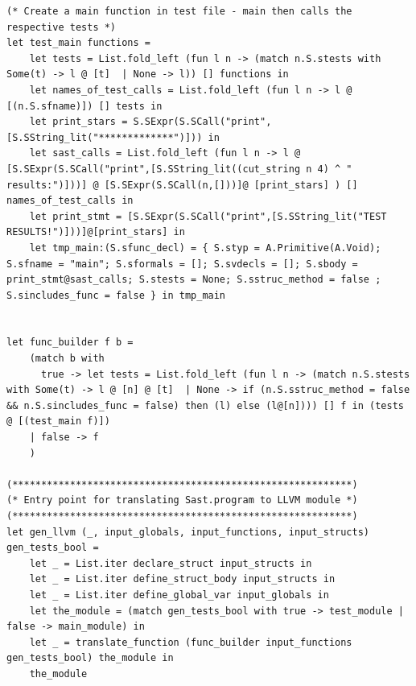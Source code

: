 \documentclass{article}
\begin{document}
\begin{lstlisting}
(* Create a main function in test file - main then calls the respective tests *)
let test_main functions = 
	let tests = List.fold_left (fun l n -> (match n.S.stests with Some(t) -> l @ [t]  | None -> l)) [] functions in 
	let names_of_test_calls = List.fold_left (fun l n -> l @ [(n.S.sfname)]) [] tests in
	let print_stars = S.SExpr(S.SCall("print", [S.SString_lit("*************")])) in 
	let sast_calls = List.fold_left (fun l n -> l @ [S.SExpr(S.SCall("print",[S.SString_lit((cut_string n 4) ^ " results:")]))] @ [S.SExpr(S.SCall(n,[]))]@ [print_stars] ) [] names_of_test_calls in
	let print_stmt = [S.SExpr(S.SCall("print",[S.SString_lit("TEST RESULTS!")]))]@[print_stars] in 
	let tmp_main:(S.sfunc_decl) = { S.styp = A.Primitive(A.Void); S.sfname = "main"; S.sformals = []; S.svdecls = []; S.sbody = print_stmt@sast_calls; S.stests = None; S.sstruc_method = false ; S.sincludes_func = false } in tmp_main


let func_builder f b = 
	(match b with 
	  true -> let tests = List.fold_left (fun l n -> (match n.S.stests with Some(t) -> l @ [n] @ [t]  | None -> if (n.S.sstruc_method = false && n.S.sincludes_func = false) then (l) else (l@[n]))) [] f in (tests @ [(test_main f)]) 
	| false -> f
	)

(***********************************************************)
(* Entry point for translating Sast.program to LLVM module *)
(***********************************************************)
let gen_llvm (_, input_globals, input_functions, input_structs) gen_tests_bool = 
	let _ = List.iter declare_struct input_structs in
	let _ = List.iter define_struct_body input_structs in
	let _ = List.iter define_global_var input_globals in
	let the_module = (match gen_tests_bool with true -> test_module | false -> main_module) in
	let _ = translate_function (func_builder input_functions gen_tests_bool) the_module in
	the_module

\end{lstlisting}

\newpage
\end{document}
